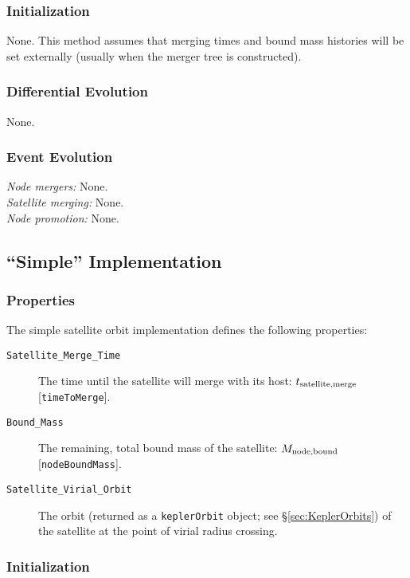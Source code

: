 \subsubsection{Initialization}

None. This method assumes that merging times and bound mass histories will be set externally (usually when the merger tree is constructed).

\subsubsection{Differential Evolution}

None.

\subsubsection{Event Evolution}

\noindent\emph{Node mergers:} None.\\

\noindent\emph{Satellite merging:} None.\\

\noindent\emph{Node promotion:} None.\\

\subsection{``Simple'' Implementation}

\subsubsection{Properties}

The simple satellite orbit implementation defines the following properties:
\begin{description}
 \item [{\tt Satellite\_Merge\_Time}] The time until the satellite will merge with its host: $t_{\rm satellite, merge}$ [{\tt timeToMerge}].
 \item [{\tt Bound\_Mass}] The remaining, total bound mass of the satellite: $M_{\rm node,bound}$ [{\tt nodeBoundMass}].
 \item[{\tt Satellite\_Virial\_Orbit}] The orbit (returned as a {\tt keplerOrbit} object; see \S\ref{sec:KeplerOrbits}) of the satellite at the point of virial radius crossing.
\end{description}

\subsubsection{Initialization}

